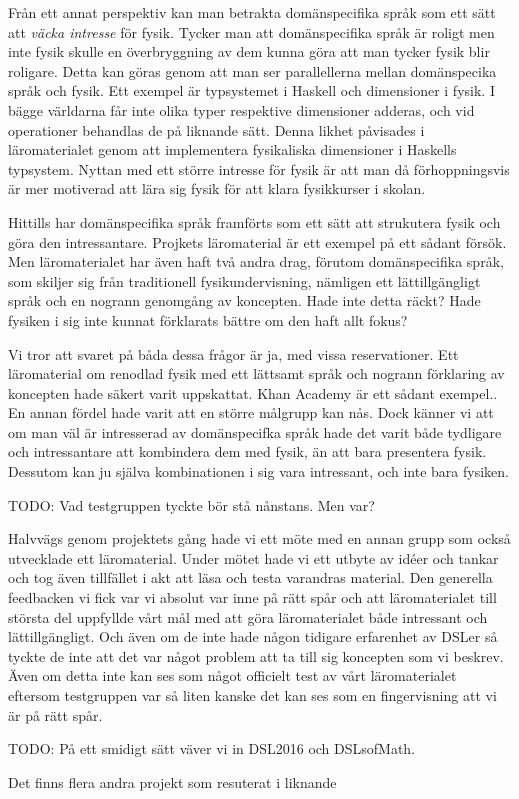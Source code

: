 \begin{binge}
Från ett annat perspektiv kan man betrakta domänspecifika språk som ett sätt att \textit{väcka intresse} för fysik. Tycker man att domänspecifika språk är roligt men inte fysik skulle en överbryggning av dem kunna göra att man tycker fysik blir roligare. Detta kan göras genom att man ser parallellerna mellan domänspecika språk och fysik. Ett exempel är typsystemet i Haskell och dimensioner i fysik. I bägge världarna får inte olika typer respektive dimensioner adderas, och vid operationer behandlas de på liknande sätt. Denna likhet påvisades i läromaterialet genom att implementera fysikaliska dimensioner i Haskells typsystem. Nyttan med ett större intresse för fysik är att man då förhoppningsvis är mer motiverad att lära sig fysik för att klara fysikkurser i skolan.

Hittills har domänspecifika språk framförts som ett sätt att strukutera fysik och göra den intressantare. Projkets läromaterial är ett exempel på ett sådant försök. Men läromaterialet har även haft två andra drag, förutom domänspecifika språk, som skiljer sig från traditionell fysikundervisning, nämligen ett lättillgängligt språk och en nogrann genomgång av koncepten. Hade inte detta räckt? Hade fysiken i sig inte kunnat förklarats bättre om den haft allt fokus?

Vi tror att svaret på båda dessa frågor är ja, med vissa reservationer. Ett läromaterial om renodlad fysik med ett lättsamt språk och nogrann förklaring av koncepten hade säkert varit uppskattat. Khan Academy är ett sådant exempel.\cite{khan}. En annan fördel hade varit att en större målgrupp kan nås. Dock känner vi att om man väl är intresserad av domänspecifka språk hade det varit både tydligare och intressantare att kombindera dem med fysik, än att bara presentera fysik. Dessutom kan ju själva kombinationen i sig vara intressant, och inte bara fysiken.

TODO: Vad testgruppen tyckte bör stå nånstans. Men var?

Halvvägs genom projektets gång hade vi ett möte med en annan grupp som också utvecklade ett läromaterial. Under mötet hade vi ett utbyte av idéer och tankar och tog även tillfället i akt att läsa och testa varandras material. Den generella feedbacken vi fick var vi absolut var inne på rätt spår och att läromaterialet till största del uppfyllde vårt mål med att göra läromaterialet både intressant och lättillgängligt. Och även om de inte hade någon tidigare erfarenhet av DSLer så tyckte de inte att det var något problem att ta till sig koncepten som vi beskrev. Även om detta inte kan ses som något officielt test av vårt läromaterialet eftersom testgruppen var så liten kanske det kan ses som en fingervisning att vi är på rätt spår.

TODO: På ett smidigt sätt väver vi in DSL2016 och DSLsofMath.

Det finns flera andra projekt som resuterat i liknande 

\end{binge}
